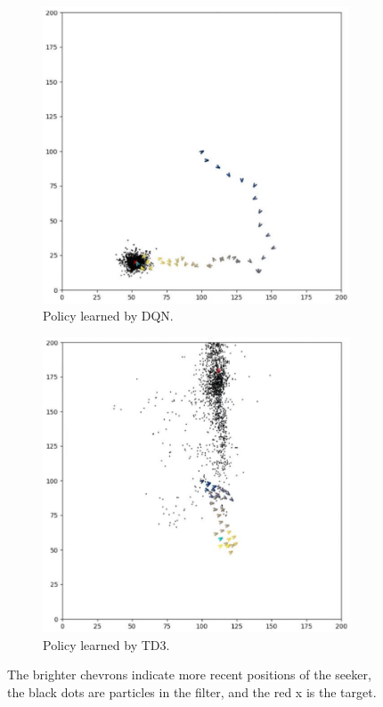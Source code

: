 \documentclass[10pt,twocolumn,letterpaper]{article}
\begin{document}
\begin{figure}[h!]
  \centering
  \begin{subfigure}[b]{0.48\linewidth}
    \includegraphics[width=\linewidth]{images/dqn-policy.png}
    \caption{Policy learned by DQN.}
  \end{subfigure}
  \begin{subfigure}[b]{0.48\linewidth}
    \includegraphics[width=\linewidth]{images/td3-policy.png}
    \caption{Policy learned by TD3.}
  \end{subfigure}
    \caption{The brighter chevrons indicate more recent positions of the seeker, the black dots are particles in the filter, and the red x is the target.}
  \label{fig:compare}
\end{figure}
\end{document}
